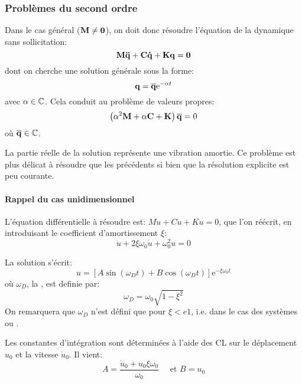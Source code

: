 \subsubsection{Problèmes du second ordre}
Dans le cas général ($\MM{M}\ne\MM{0}$), on doit donc résoudre l'équation de la dynamique 
sans sollicitation:
\begin{equation} \MM{M}\VV{\ddot{q}}+\MM{C}\VV{\dot{q}}+\MM{K}\VV{q}=\VV{0} \end{equation}
dont on cherche une solution générale sous la forme:
\begin{equation} \VV{q}=\VV{\overline{q}}\mathrm{e}^{-\alpha t} \end{equation}
avec $\alpha\in\mathbb C$.
Cela conduit au problème de valeurs propres:
\begin{equation} \left(\alpha^2\MM{M}+\alpha\MM{C}+\MM{K}\right)\VV{\overline{q}}=0\end{equation}
où $\VV{\overline{q}}\in\CC$.

La partie réelle de la solution représente une vibration amortie. 
Ce problème est plus délicat à résoudre que les précédents si bien que la résolution 
explicite est peu courante.

\medskip
{}
\paragraph{Rappel du cas unidimensionnel}
L'équation différentielle à résoudre est: $M\ddot{u}+C\dot{u}+Ku=0$, que l'on
réécrit, en introduisant le coefficient d'amortissement $\xi$: 
\begin{equation}\ddot{u}+2\xi\omega_0\dot{u}+\omega^2_0 u=0\end{equation}

La solution s'écrit: \begin{equation} u=\left[A\sin (\omega_D t)+B\cos(\omega_D t)\right] \mathrm{e}^{-\xi\omega_0t} \end{equation}
où $\omega_D$, la , est definie par:
\begin{equation}\omega_D=\omega_0\sqrt{1-\xi^2}\end{equation}
On remarquera que $\omega_D$ n'est défini que pour $\xi<e1$, i.e.
dans le cas des systèmes  ou .

Les constantes d'intégration sont déterminées à l'aide des CL sur le déplacement $u_0$ et la
vitesse $\dot{u}_0$. Il vient: \begin{equation} A=\dfrac{\dot{u}_0+u_0\xi\omega_0}{\omega_0} \quad \text{ et } B=u_0\end{equation}

